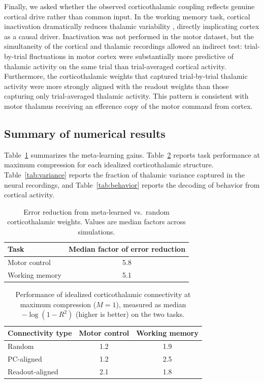 \documentclass[11pt]{article}
\begin{document}
Finally, we asked whether the observed corticothalamic coupling
reflects genuine cortical drive rather than common input. In the
working memory task, cortical inactivation dramatically reduces
thalamic variability \cite{guo2017maintenance}, directly implicating
cortex as a causal driver. Inactivation was not performed in the motor
dataset, but the simultaneity of the cortical and thalamic recordings
allowed an indirect test: trial-by-trial fluctuations in motor cortex
were substantially more predictive of thalamic activity on the same
trial than trial-averaged cortical activity. Furthermore, the
corticothalamic weights that captured trial-by-trial thalamic activity
were more strongly aligned with the readout weights than those
capturing only trial-averaged thalamic activity. This pattern is
consistent with motor thalamus receiving an efference copy of the
motor command from cortex.

\subsection{Summary of numerical results}

Table~\ref{tab:metalearning} summarizes the meta-learning gains.
Table~\ref{tab:idealized} reports task performance at maximum
compression for each idealized corticothalamic structure.
Table~\ref{tab:variance} reports the fraction of thalamic variance
captured in the neural recordings, and Table~\ref{tab:behavior}
reports the decoding of behavior from cortical activity.

\begin{table}[htbp]
\centering
\caption{Error reduction from meta-learned vs.\ random corticothalamic
weights. Values are median factors across simulations.}
\label{tab:metalearning}
\begin{tabular}{lc}
\toprule
Task & Median factor of error reduction \\
\midrule
Motor control & 5.8 \\
Working memory & 5.1 \\
\bottomrule
\end{tabular}
\end{table}

\begin{table}[htbp]
\centering
\caption{Performance of idealized corticothalamic connectivity at
maximum compression ($M = 1$), measured as median $-\log(1 - R^2)$
(higher is better) on the two tasks.}
\label{tab:idealized}
\begin{tabular}{lcc}
\toprule
Connectivity type & Motor control & Working memory \\
\midrule
Random  & 1.2 & 1.9 \\
PC-aligned & 1.2 & 2.5 \\
Readout-aligned & 2.1 & 1.8 \\
\bottomrule
\end{tabular}
\end{table}
\end{document}
